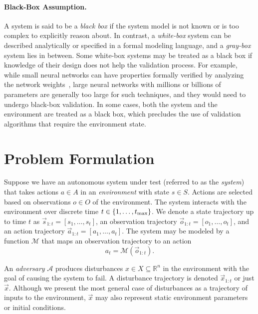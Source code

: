 \paragraph{Black-Box Assumption.}
A system is said to be a \emph{black box} if the system model is not known or is too complex to explicitly reason about. In contrast, a \emph{white-box} system can be described analytically or specified in a formal modeling language, and a \emph{gray-box} system lies in between. Some white-box systems may be treated as a black box if knowledge of their design does not help the validation process. For example, while small neural networks can have properties formally verified by analyzing the network weights~\cite{katz2017reluplex}, large neural networks with millions or billions of parameters are generally too large for such techniques, and they would need to undergo black-box validation. In some cases, both the system and the environment are treated as a black box, which precludes the use of validation algorithms that require the environment state.

\section{Problem Formulation}
\label{sec:problem_formulation}
Suppose we have an autonomous system under test (referred to as the \emph{system}) that takes actions $a \in A$ in an \emph{environment} with state $s \in S$. Actions are selected based on observations $o \in O$ of the environment. The system interacts with the environment over discrete time $t \in \{1, \ldots, t_{\rm max}\}$. We denote a state trajectory up to time $t$ as $\vec{s}_{1:t} = [s_1, \ldots, s_t]$, an observation trajectory $\vec{o}_{1:t} = [o_1, \ldots, o_t]$, and an action trajectory $\vec{a}_{1:t} = [a_1, \ldots, a_t]$. The system may be modeled by a function $\mathcal{M}$ that maps an observation trajectory to an action
\begin{equation}
    a_t = \mathcal{M}(\vec{o}_{1:t}) \text{.} \label{eq:system} 
\end{equation}

An \emph{adversary} $\mathcal{A}$ produces disturbances $x \in X\subseteq \mathbb{R}^n$ in the environment with the goal of causing the system to fail. A disturbance trajectory is denoted $\vec{x}_{1:t}$ or just $\vec{x}$. Although we present the most general case of disturbances as a trajectory of inputs to the environment, $\vec{x}$ may also represent static environment parameters or initial conditions. 

